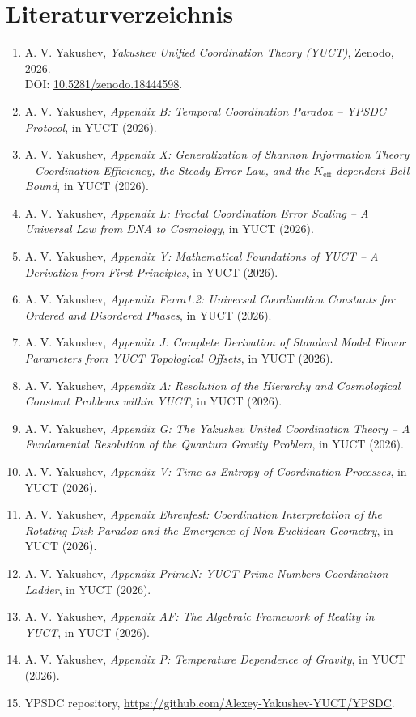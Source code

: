 \documentclass[12pt,a4paper]{article}
\begin{document}
	\section*{Literaturverzeichnis}
	\begin{enumerate}
		\item A. V. Yakushev, \emph{Yakushev Unified Coordination Theory (YUCT)}, Zenodo, 2026. \\ DOI: \href{https://doi.org/10.5281/zenodo.18444598}{10.5281/zenodo.18444598}.
		\item A. V. Yakushev, \emph{Appendix B: Temporal Coordination Paradox – YPSDC Protocol}, in YUCT (2026).
		\item A. V. Yakushev, \emph{Appendix X: Generalization of Shannon Information Theory – Coordination Efficiency, the Steady Error Law, and the \(K_{\mathrm{eff}}\)-dependent Bell Bound}, in YUCT (2026).
		\item A. V. Yakushev, \emph{Appendix L: Fractal Coordination Error Scaling – A Universal Law from DNA to Cosmology}, in YUCT (2026).
		\item A. V. Yakushev, \emph{Appendix Y: Mathematical Foundations of YUCT – A Derivation from First Principles}, in YUCT (2026).
		\item A. V. Yakushev, \emph{Appendix Ferra1.2: Universal Coordination Constants for Ordered and Disordered Phases}, in YUCT (2026).
		\item A. V. Yakushev, \emph{Appendix J: Complete Derivation of Standard Model Flavor Parameters from YUCT Topological Offsets}, in YUCT (2026).
		\item A. V. Yakushev, \emph{Appendix \(\Lambda\): Resolution of the Hierarchy and Cosmological Constant Problems within YUCT}, in YUCT (2026).
		\item A. V. Yakushev, \emph{Appendix G: The Yakushev United Coordination Theory – A Fundamental Resolution of the Quantum Gravity Problem}, in YUCT (2026).
		\item A. V. Yakushev, \emph{Appendix V: Time as Entropy of Coordination Processes}, in YUCT (2026).
		\item A. V. Yakushev, \emph{Appendix Ehrenfest: Coordination Interpretation of the Rotating Disk Paradox and the Emergence of Non-Euclidean Geometry}, in YUCT (2026).
		\item A. V. Yakushev, \emph{Appendix PrimeN: YUCT Prime Numbers Coordination Ladder}, in YUCT (2026).
		\item A. V. Yakushev, \emph{Appendix AF: The Algebraic Framework of Reality in YUCT}, in YUCT (2026).
		\item A. V. Yakushev, \emph{Appendix P: Temperature Dependence of Gravity}, in YUCT (2026).
		\item YPSDC repository, \url{https://github.com/Alexey-Yakushev-YUCT/YPSDC}.
	\end{enumerate}
	
\end{document}

